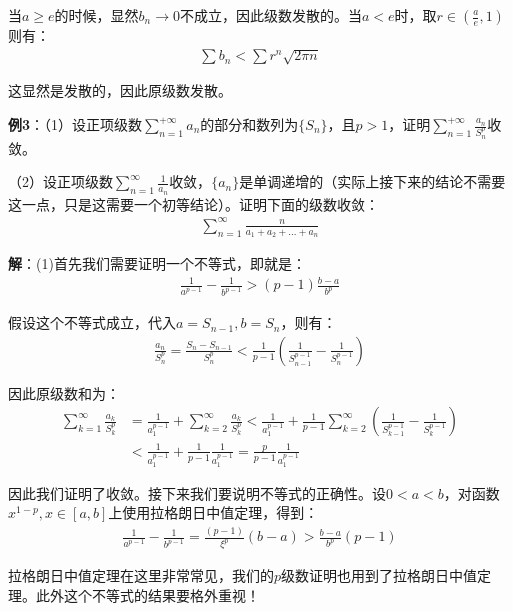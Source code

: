 \documentclass{ctexart}
\let\oldtextbf\textbf
\renewcommand{\textbf}[1]{\textcolor{brown!50!red}{\oldtextbf{#1}}}
\begin{document}
当$a\geq e$的时候，显然$b_n\to 0$不成立，因此级数发散的。当$a<e$时，取$r\in(\frac{a}{e},1)$则有：
\begin{align*}
    \sum b_n<\sum r^n\sqrt{2\pi n}
\end{align*}

这显然是发散的，因此原级数发散。

\textbf{\color{brown!50!red}例3}：（1）设正项级数$\sum_{n=1}^{+\infty}a_n$的部分和数列为$\{S_n\}$，且$p>1$，证明$\sum_{n=1}^{+\infty}\frac{a_n}{S_n^p}$收敛。

（2）设正项级数$\sum_{n=1}^\infty\frac{1}{a_n}$收敛，$\{a_n\}$是单调递增的（实际上接下来的结论不需要这一点，只是这需要一个初等结论）。证明下面的级数收敛：
\begin{align*}
    \sum_{n=1}^\infty \frac{n}{a_1+a_2+...+a_n}
\end{align*}

\textbf{\color{brown!50!red}解}：(1)首先我们需要证明一个不等式，即就是：
\begin{align*}
    \frac{1}{a^{p-1}}-\frac{1}{b^{p-1}}>(p-1)\frac{b-a}{b^p}
\end{align*}

假设这个不等式成立，代入$a=S_{n-1},b=S_n$，则有：
\begin{align*}
    \frac{a_n}{S_n^p}=\frac{S_n-S_{n-1}}{S_n^p}<\frac{1}{p-1}\left(\frac{1}{S_{n-1}^{p-1}}-\frac{1}{S_n^{p-1}}\right)
\end{align*}

因此原级数和为：
\begin{align*}
    \sum_{k=1}^\infty\frac{a_k}{S_k^p}&=\frac{1}{a_1^{p-1}}+\sum_{k=2}^\infty\frac{a_k}{S_k^p}<\frac{1}{a_1^{p-1}}+\frac{1}{p-1}\sum_{k=2}^\infty\left(\frac{1}{S_{k-1}^{p-1}}-\frac{1}{S_k^{p-1}}\right)\\
    &<\frac{1}{a_1^{p-1}}+\frac{1}{p-1}\frac{1}{a_1^{p-1}}=\frac{p}{p-1}\frac{1}{a_1^{p-1}}
\end{align*}

因此我们证明了收敛。接下来我们要说明不等式的正确性。设$0<a<b$，对函数$x^{1-p},x\in[a,b]$上使用拉格朗日中值定理，得到：
\begin{align*}
    \frac{1}{a^{p-1}}-\frac{1}{b^{p-1}}=\frac{(p-1)}{\xi^p}(b-a)>\frac{b-a}{b^p}(p-1)
\end{align*}
\begin{tcolorbox}[
    colback=bac1,     %
    colframe=fra1,   %
    coltitle=white!80,    
    coltext=tex1,%
    title=注意,
    fonttitle=\bfseries,        %
arc=2mm,                     %
breakable
]
拉格朗日中值定理在这里非常常见，我们的$p$级数证明也用到了拉格朗日中值定理。此外这个不等式的结果要格外重视！
\end{tcolorbox}
\end{document}

